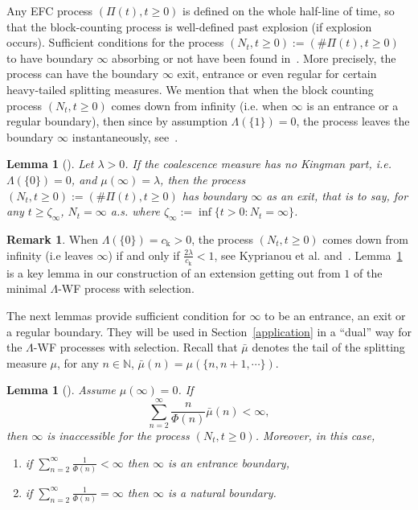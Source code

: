 \documentclass[10pt]{amsart}
\newtheorem{lemm}[theo]{Lemma}\newtheorem{prop}[theo]{Proposition}\newtheorem{coro}[theo]{Corollary}\newtheorem{conj}[theo]{Conjecture}
\theoremstyle{definition}\newtheorem{defi}[theo]{Definition}\newtheorem{rema}[theo]{Remark}\newtheorem{exam}[theo]{Example}\newtheorem{exem}[theo]{Example}\newtheorem{nota}[theo]{Notation}
\newcommand{\rmk}{\mathrm{k}}
\newcommand{\bbN}{\mathbb{N}}
\newcommand*{\romanenumi}{\renewcommand*{\theenumi}{\roman{enumi}}}
\begin{document}
Any EFC process $(\Pi(t),t\geq 0)$ is defined on the whole half-line of time, so that the block-counting process is well-defined past explosion (if explosion occurs). Sufficient conditions for the process $(N_t,t\geq 0):=(\#\Pi(t),t\geq 0)$ to have boundary $\infty$ absorbing or not have been found in~\cite{cdiEFC}. More precisely, the process can have the boundary $\infty$ exit, entrance or even regular for certain heavy-tailed splitting measures. We mention that when the block counting process $(N_t,t\geq 0)$ comes down from infinity (i.e. when $\infty$ is an entrance or a regular boundary), then since by assumption $\Lambda(\{1\})=0$, the process leaves the boundary $\infty$ instantaneously, see~\cite[Lemma~2.5]{cdiEFC}.

\begin{lemm}[{\cite[Corollary~1.2-(2)]{cdiEFC}}]\label{key}
Let $\lambda>0$. If the coalescence measure has no Kingman part, i.e. $\Lambda(\{0\})=0$, and $\mu(\infty)=\lambda$, then the process $(N_t,t\geq 0):=(\#\Pi(t),t\geq 0)$ has boundary $\infty$ as an exit, that is to say, for any $t\geq \zeta_{\infty}$, $N_t=\infty$ a.s.
where $\zeta_{\infty}:=\inf\{t>0: N_t=\infty\}$.
\end{lemm}

\begin{rema}\label{remkey}
When $\Lambda(\{0\})=c_{\rmk}>0$, the process $(N_t,t\geq 0)$ comes down from infinity (i.e leaves $\infty$) if and only if $\frac{2\lambda}{c_{\rmk}}<1$, see Kyprianou et al. \cite[Theorem~1.1]{kyprianou2017} and~\cite[Corollary~1.2-(1)]{cdiEFC}. Lemma~\ref{key} is a key lemma in our construction of an extension getting out from $1$ of the minimal $\Lambda$-WF process with selection.
\end{rema}

The next lemmas provide sufficient condition for $\infty$ to be an entrance, an exit or a regular boundary. They will be used in Section~\ref{application} in a ``dual'' way for the $\Lambda$-WF processes with selection. Recall that $\bar\mu$ denotes the tail of the splitting measure $\mu$, for any $n\in \bbN$, $\bar\mu(n)=\mu(\{n,n+1,\cdots\})$.
\begin{lemm}[{\cite[Theorem~3.4]{explosion}}] \label{nonexplosioncriterion}
Assume $\mu(\infty)=0$. If
\[
\sum_{n=2}^{\infty}\frac{n}{\Phi(n)}\bar{\mu}(n)<\infty,
\]
then $\infty$ is inaccessible for the process $(N_t,t\geq 0)$. Moreover, in this case,
\begin{enumerate}\romanenumi
\item if $\sum_{n=2}^{\infty}\frac{1}{\Phi(n)}<\infty$ then $\infty$ is an entrance boundary,
\item if $\sum_{n=2}^{\infty}\frac{1}{\Phi(n)}=\infty$ then $\infty$ is a natural boundary.
\end{enumerate}
\end{lemm}
\end{document}
